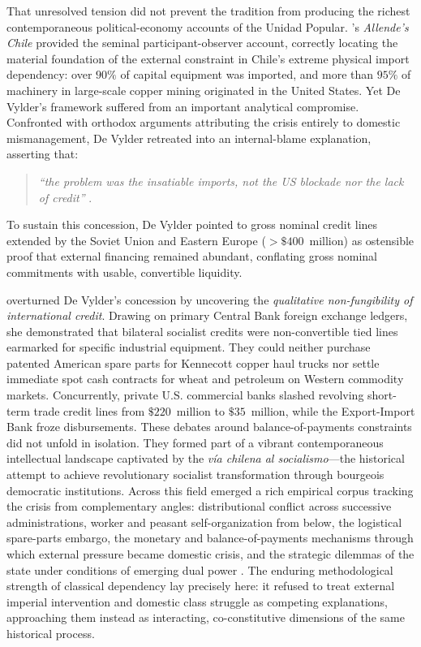 That unresolved tension did not prevent the tradition from producing the richest 
contemporaneous political-economy accounts of the Unidad Popular. \citet{DeVylder1976}'s \textit{Allende's Chile} 
provided the seminal participant-observer account, correctly locating the material foundation 
of the external constraint in Chile's extreme physical import dependency: over $90\%$ of capital 
equipment was imported, and more than $95\%$ of machinery in large-scale copper mining originated 
in the United States. Yet De Vylder's framework suffered from an important analytical compromise. 
Confronted with orthodox arguments attributing the crisis entirely to domestic mismanagement, 
De Vylder retreated into an internal-blame explanation, asserting that: 
\begin{quote}
	\emph{``the problem was the  insatiable imports, not the US blockade nor the lack of credit''} \citep[p.~106]{DeVylder1976}. 
\end{quote}

To sustain this concession, De Vylder pointed to gross nominal credit lines extended by the Soviet 
Union and Eastern Europe ($>\$400$~million) as ostensible proof that external financing remained 
abundant, conflating gross nominal commitments with usable, convertible liquidity.

\citet{Stallings1978}  overturned De Vylder's concession by uncovering 
the \textit{qualitative non-fungibility of international credit}. Drawing on primary Central 
Bank foreign exchange ledgers, she demonstrated that bilateral socialist credits were 
non-convertible tied lines earmarked for specific industrial equipment. They could neither 
purchase patented American spare parts for Kennecott copper haul trucks nor settle immediate 
spot cash contracts for wheat and petroleum on Western commodity markets. Concurrently, private 
U.S. commercial banks slashed revolving short-term trade credit lines from $\$220$~million to 
$\$35$~million, while the Export-Import Bank froze disbursements. These debates around balance-of-payments constraints did not unfold in isolation. They formed part of a 
vibrant contemporaneous intellectual landscape captivated by the \textit{vía chilena al socialismo}---the 
historical attempt to achieve revolutionary socialist transformation through 
bourgeois democratic institutions. Across this field emerged a rich empirical corpus tracking 
the crisis from complementary angles: distributional conflict across successive administrations, 
worker and peasant self-organization from below, the logistical spare-parts embargo, the monetary 
and balance-of-payments mechanisms through which external pressure became domestic crisis, and 
the strategic dilemmas of the state under conditions of emerging dual power 
\citep{StallingsZimbalist1975,EspinosaZimbalist1978,Kay1978,PetrasMorley1975,GriffithJones1981,Sideri1979,SweezyMagdoff1974,ZavaletaMercado1974,Winn1986}.  The enduring methodological strength of classical dependency lay precisely here: it refused to  treat external imperial intervention and domestic class struggle as competing explanations,  approaching them instead as interacting, co-constitutive dimensions of the same historical process.

